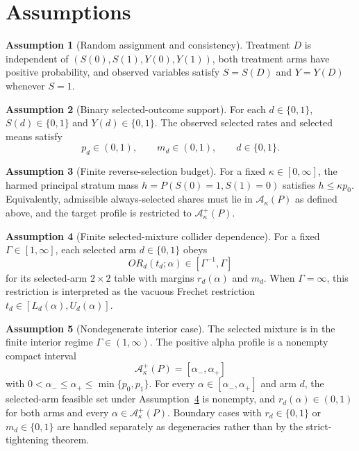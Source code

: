 \documentclass[11pt]{article}
\theoremstyle{definition}
\newtheorem{assumption}{Assumption}
\theoremstyle{plain}
\theoremstyle{remark}
\begin{document}
\section{Assumptions}
\begin{assumption}[Random assignment and consistency]\label{ass:random-consistency}
Treatment \(D\) is independent of \((S(0),S(1),Y(0),Y(1))\), both treatment
arms have positive probability, and observed variables satisfy \(S=S(D)\) and
\(Y=Y(D)\) whenever \(S=1\).
\end{assumption}

\begin{assumption}[Binary selected-outcome support]\label{ass:binary-support}
For each \(d\in\{0,1\}\), \(S(d)\in\{0,1\}\) and \(Y(d)\in\{0,1\}\).  The
observed selected rates and selected means satisfy
\[
  p_d\in(0,1),\qquad m_d\in(0,1),\qquad d\in\{0,1\}.
\]
\end{assumption}

\begin{assumption}[Finite reverse-selection budget]\label{ass:reverse-budget}
For a fixed \(\kappa\in[0,\infty]\), the harmed principal stratum mass
\(h=P(S(0)=1,S(1)=0)\) satisfies \(h\le \kappa p_0\).  Equivalently, admissible
always-selected shares must lie in \(\mathcal A_\kappa(P)\) as defined above,
and the target profile is restricted to \(\mathcal A_\kappa^+(P)\).
\end{assumption}

\begin{assumption}[Finite selected-mixture collider dependence]\label{ass:gamma-mixture}
For a fixed \(\Gamma\in[1,\infty]\), each selected arm \(d\in\{0,1\}\) obeys
\[
  OR_d(t_d;\alpha)\in[\Gamma^{-1},\Gamma]
\]
for its selected-arm \(2\times2\) table with margins \(r_d(\alpha)\) and
\(m_d\).  When \(\Gamma=\infty\), this restriction is interpreted as the
vacuous Frechet restriction \(t_d\in[L_d(\alpha),U_d(\alpha)]\).
\end{assumption}

\begin{assumption}[Nondegenerate interior case]\label{ass:interior}
The selected mixture is in the finite interior regime \(\Gamma\in(1,\infty)\).
The positive alpha profile is a nonempty compact interval
\[
  \mathcal A_\kappa^+(P)=[\alpha_-,\alpha_+]
\]
with \(0<\alpha_-\le \alpha_+\le \min\{p_0,p_1\}\).  For every
\(\alpha\in[\alpha_-,\alpha_+]\) and arm \(d\), the selected-arm feasible set
under Assumption~\ref{ass:gamma-mixture} is nonempty, and
\(r_d(\alpha)\in(0,1)\) for both arms and every
\(\alpha\in\mathcal A_\kappa^+(P)\).  Boundary cases with \(r_d\in\{0,1\}\) or
\(m_d\in\{0,1\}\) are handled separately as degeneracies rather than by the
strict-tightening theorem.
\end{assumption}
\end{document}
